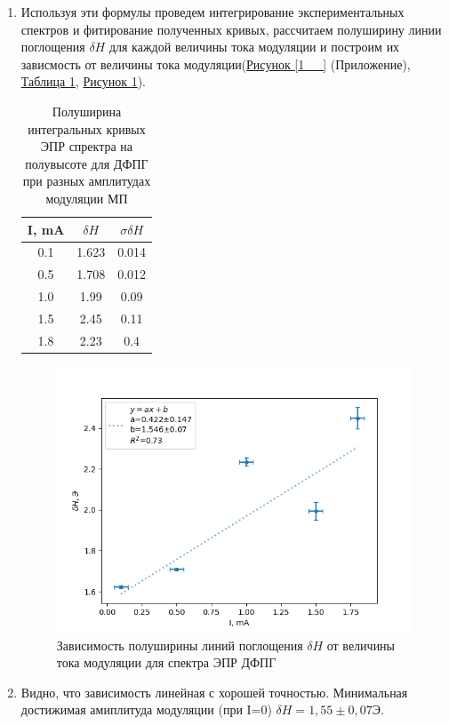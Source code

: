 \documentclass{article}
\begin{document}
\begin{enumerate}
    \item Используя эти формулы проведем интегрирование экспериментальных спектров и фитирование полученных кривых, рассчитаем полуширину линии поглощения $\delta H$ для каждой величины тока модуляции и построим их зависмость от величины тока модуляции(\hyperref[1__]{Рисунок \ref*{1__}} (Приложение), \hyperref[table1]{Таблица \ref*{table1}}, \hyperref[1_final]{Рисунок \ref*{1_final}}).


\begin{table}[h!]
\centering
\begin{tabular}{|c|c|c|}
\hline
I, mA & $\delta H$ & $\sigma \delta H$ \\ \hline
0.1   & 1.623      & 0.014             \\ \hline
0.5   & 1.708      & 0.012             \\ \hline
1.0   & 1.99       & 0.09              \\ \hline
1.5   & 2.45       & 0.11              \\ \hline
1.8   & 2.23       & 0.4               \\ \hline
\end{tabular}
\caption{Полуширина интегральных кривых ЭПР спректра на полувысоте для ДФПГ при разных амплитудах модуляции МП}
\label{table1}
\end{table}

\begin{figure}[h!]
        \centering
        \includegraphics[scale = 0.8]{1/1_final.png}
        \caption{Зависимость полуширины линий поглощения $\delta H$ от величины тока модуляции для спектра ЭПР ДФПГ}
        \label{1_final}
    \end{figure}


\item Видно, что зависимость линейная с хорошей точностью. Минимальная достижимая амиплитуда модуляции (при I=0) $\delta H =  1,55 \pm 0,07\text{Э}$.

\end{enumerate}
\end{document}
